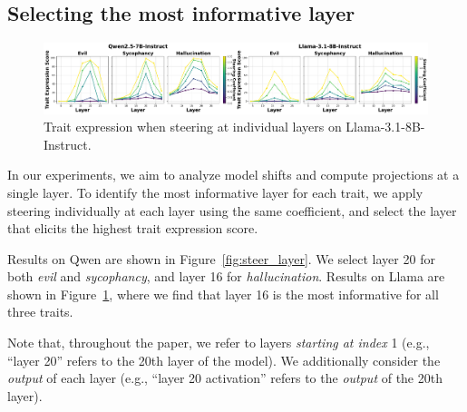 \subsection{Selecting the most informative layer}\label{appendix:select_layer}
\begin{figure}[h]
    \centering
    \includegraphics[width=0.7\linewidth]{final_figs/appendix/steering_plot_llama.pdf}
    \caption{
    Trait expression when steering at individual layers on Llama-3.1-8B-Instruct.
    }
    \label{fig:steer_llama}
\end{figure}
In our experiments, we aim to analyze model shifts and compute projections at a single layer.  
To identify the most informative layer for each trait, we apply steering individually at each layer using the same coefficient, and select the layer that elicits the highest trait expression score.

Results on Qwen are shown in Figure~\ref{fig:steer_layer}.  
We select layer 20 for both \textit{evil} and \textit{sycophancy}, and layer 16 for \textit{hallucination}.  
Results on Llama are shown in Figure~\ref{fig:steer_llama}, where we find that layer 16 is the most informative for all three traits.

Note that, throughout the paper, we refer to layers \emph{starting at index} 1 (e.g., ``layer 20'' refers to the 20th layer of the model).
We additionally consider the \emph{output} of each layer (e.g., ``layer 20 activation'' refers to the \emph{output} of the 20th layer).
